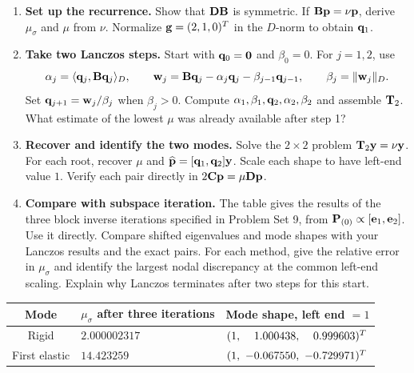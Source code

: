 \documentclass[12pt]{article}
\begin{document}
\begin{enumerate}
  \item[a)] \textbf{Set up the recurrence.} Show that $\mathbf{D}\mathbf{B}$ is symmetric.
        If $\mathbf{B}\mathbf{p}=\nu\mathbf{p}$, derive $\mu_\sigma$ and $\mu$ from $\nu$.
        Normalize $\mathbf{g}=(2,1,0)^{T}$ in the $D$-norm to obtain $\mathbf{q}_1$.
  \item[b)] \textbf{Take two Lanczos steps.} Start with $\mathbf{q}_0=\mathbf{0}$ and
        $\beta_0=0$. For $j=1,2$, use
        \[
          \alpha_j=\langle\mathbf{q}_j,\mathbf{B}\mathbf{q}_j\rangle_D,\qquad
          \mathbf{w}_j=\mathbf{B}\mathbf{q}_j-\alpha_j\mathbf{q}_j-\beta_{j-1}\mathbf{q}_{j-1},
          \qquad \beta_j=\|\mathbf{w}_j\|_D .
        \]
        Set $\mathbf{q}_{j+1}=\mathbf{w}_j/\beta_j$ when $\beta_j>0$.
        Compute $\alpha_1,\beta_1,\mathbf{q}_2,\alpha_2,\beta_2$ and assemble $\mathbf{T}_2$.
        What estimate of the lowest $\mu$ was already available after step 1?
  \item[c)] \textbf{Recover and identify the two modes.} Solve the $2\times2$
        problem $\mathbf{T}_2\mathbf{y}=\nu\mathbf{y}$. For each root, recover $\mu$ and
        $\widehat{\mathbf{p}}=[\mathbf{q}_1,\mathbf{q}_2]\mathbf{y}$. Scale each shape to have
        left-end value $1$. Verify each pair directly in $2\mathbf{C}\mathbf{p}=\mu\mathbf{D}\mathbf{p}$.
  \item[d)] \textbf{Compare with subspace iteration.} The table gives the results
        of the three block inverse iterations specified in Problem Set 9, from
        $\mathbf{P}_{(0)}\propto[\mathbf{e}_1,\mathbf{e}_2]$. Use it directly.
        Compare shifted eigenvalues and mode shapes with your Lanczos results and
        the exact pairs. For each method, give the relative error in $\mu_\sigma$
        and identify the largest nodal discrepancy at the common left-end scaling.
        Explain why Lanczos terminates after two steps for this start.
\end{enumerate}
\begin{center}
  \begin{tabular}{@{}cll@{}}
    \toprule
    Mode          & $\mu_\sigma$ after three iterations & Mode shape, left end $=1$                           \\
    \midrule
    Rigid         & $2.000002317$                       & $(1,\ \phantom{-}1.000438,\ \phantom{-}0.999603)\T$ \\
    First elastic & $14.423259$                         & $(1,\ -0.067550,\ -0.729971)\T$                     \\
    \bottomrule
  \end{tabular}
\end{center}
\end{document}

